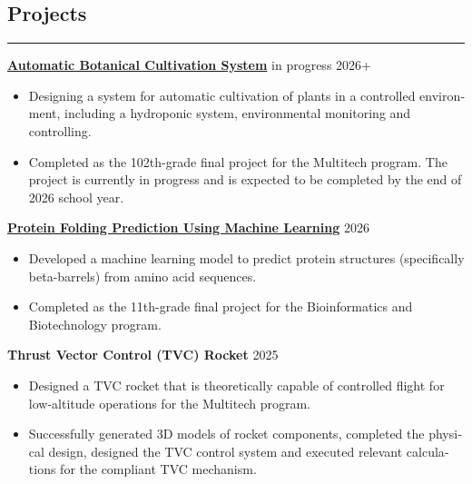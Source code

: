 \documentclass[11pt, a4paper]{article}
\begin{document}
\begin{english}
\section*{Projects}
\hrule \vspace{8pt}


\noindent \textbf{\href{https://drive.google.com/drive/folders/1yNS5S2wWANxv9-eX3gLDz9avkhK4RcNj?usp=sharing}{Automatic Botanical Cultivation System}} \hfill in progress 2026+
\begin{itemize}[itemsep=2pt, parsep=0pt, topsep=2pt]
    \item Designing a system for automatic cultivation of plants in a controlled environment, including a hydroponic system, environmental monitoring and controlling.
    \item Completed as the 102th-grade final project for the Multitech program. The project is currently in progress and is expected to be completed by the end of 2026 school year.
\end{itemize}

\vspace{5pt}

\noindent \textbf{\href{https://github.com/dotRetrd1/Ifold}{Protein Folding Prediction Using Machine Learning}} \hfill 2026
\begin{itemize}[itemsep=2pt, parsep=0pt, topsep=2pt]
    \item Developed a machine learning model to predict protein structures (specifically beta-barrels) from amino acid sequences.
    \item Completed as the 11th-grade final project for the Bioinformatics and Biotechnology program.
\end{itemize}

\vspace{5pt}

\noindent \textbf{Thrust Vector Control (TVC) Rocket} \hfill 2025
\begin{itemize}[itemsep=2pt, parsep=0pt, topsep=2pt]
    \item Designed a TVC rocket that is theoretically capable of controlled flight for low-altitude operations for the Multitech program.
    \item Successfully generated 3D models of rocket components, completed the physical design, designed the TVC control system and executed relevant calculations for the compliant TVC mechanism.
\end{itemize}

\vspace{5pt}


\end{english}
\end{document}
